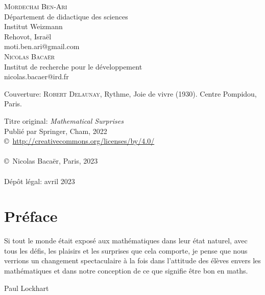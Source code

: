 



\noindent \textsc{Mordechai Ben-Ari}\\
Département de didactique des sciences\\
Institut Weizmann \\
Rehovot, Israël\\
moti.ben.ari@gmail.com\\


\noindent  \textsc{Nicolas Baca\"er}\\
{Institut de recherche pour le d\'eveloppement}\\
nicolas.bacaer@ird.fr\\

\vspace{3cm}

\noindent Couverture: \textsc{Robert Delaunay}, Rythme, Joie de vivre (1930). Centre Pompidou, Paris. 

\vspace{3cm}

\noindent Titre original: \emph{Mathematical Surprises}\\
Publié par Springer, Cham, 2022\\
\noindent \copyright\ \url{http://creativecommons.org/licenses/by/4.0/}\\

\\
\noindent \copyright\ {Nicolas Bacaër, Paris, 2023} \\
 \\
{Dépôt légal: avril 2023}\\

\rhead[\fancyplain{}{}]%
{\fancyplain{}{\thepage}}
\cfoot{}
\pagestyle{fancyplain}



\chapter*{Préface}

\epigraph{Si tout le monde était exposé aux mathématiques dans leur état naturel, avec tous les défis, les plaisirs et les surprises que cela comporte, je pense que nous verrions un changement spectaculaire à la fois dans l'attitude des élèves envers les mathématiques et dans notre conception de ce que signifie être \og bon en maths\fg.}{Paul Lockhart}

